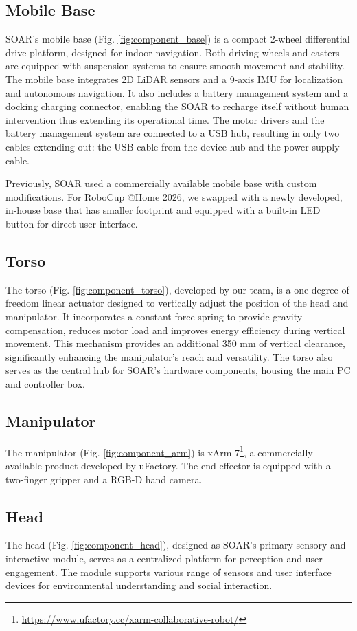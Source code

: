 \documentclass[runningheads,a4paper]{llncs}
\begin{document}
\subsection{Mobile Base}
SOAR's mobile base (Fig. \ref{fig:component_base}) is a compact 2-wheel differential drive platform, designed for indoor navigation.
Both driving wheels and casters are equipped with suspension systems to ensure smooth movement and stability.
The mobile base integrates 2D LiDAR sensors and a 9-axis IMU for localization and autonomous navigation.
It also includes a battery management system and a docking charging connector, enabling the SOAR to recharge itself without human intervention thus extending its operational time.
The motor drivers and the battery management system are connected to a USB hub, resulting in only two cables extending out: the USB cable from the device hub and the power supply cable.

Previously, SOAR used a commercially available mobile base with custom modifications.
For RoboCup @Home 2026, we swapped with a newly developed, in-house base that has smaller footprint and equipped with a built-in LED button for direct user interface.

\subsection{Torso}
The torso (Fig. \ref{fig:component_torso}), developed by our team, is a one degree of freedom linear actuator designed to vertically adjust the position of the head and manipulator.
It incorporates a constant-force spring to provide gravity compensation, reduces motor load and improves energy efficiency during vertical movement.
This mechanism provides an additional 350 mm of vertical clearance, significantly enhancing the manipulator's reach and versatility.
The torso also serves as the central hub for SOAR's hardware components, housing the main PC and controller box.

\subsection{Manipulator}
The manipulator (Fig. \ref{fig:component_arm}) is xArm 7\footnote{\url{https://www.ufactory.cc/xarm-collaborative-robot/}}, a commercially available product developed by uFactory.
The end-effector is equipped with a two-finger gripper and a RGB-D hand camera.

\subsection{Head}
The head (Fig. \ref{fig:component_head}), designed as SOAR's primary sensory and interactive module, serves as a centralized platform for perception and user engagement.
The module supports various range of sensors and user interface devices for environmental understanding and social interaction.
\end{document}
